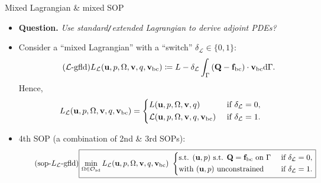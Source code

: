 \documentclass[10pt
hyperref={
    pdfauthor={Hong Quan Ba Nguyen},
    pdftitle={Optimal Shape Design of Air Ducts in Combustion Engines: Design a General Framework},
    pdfsubject={Talk},
    pdfcreator={LaTeX},
}
]{beamer}
\begin{document}
\begin{frame}{Mixed Lagrangian {\small\&} mixed SOP}
    \begin{itemize}
        \item \textbf{Question.} \textit{Use standard\texttt{/}extended Lagrangian to derive adjoint PDEs?}
        \item Consider a ``mixed Lagrangian'' with a ``switch'' $\delta_{\mathcal{L}}\in\{0,1\}$:
        \begin{align}
            \label{mixed Lagrangian for general stationary fluid dynamics PDEs}
            \tag{$\mathcal{L}$-gfld}
            L_{\mathcal{L}}(\textbf{u},p,\Omega,\textbf{v},q,\textbf{v}_{\rm bc})\coloneqq L - \delta_{\mathcal{L}}\int_\Gamma \left(\textbf{Q} - \textbf{f}_{\rm bc}\right)\cdot\textbf{v}_{\rm bc}{\rm d}\Gamma.
        \end{align}
        Hence,
        \begin{equation*}
            L_{\mathcal{L}}(\textbf{u},p,\Omega,\textbf{v},q,\textbf{v}_{\rm bc}) = \left\{\begin{split}
                &L(\textbf{u},p,\Omega,\textbf{v},q) &&\mbox{ if } \delta_{\mathcal{L}} = 0,\\
                &\mathcal{L}(\textbf{u},p,\Omega,\textbf{v},q,\textbf{v}_{\rm bc}) &&\mbox{ if } \delta_{\mathcal{L}} = 1.
            \end{split}\right.
        \end{equation*}
        \item 4th SOP (a combination of 2nd {\small\&} 3rd SOPs):
        \begin{equation}
            \label{SOP for mixed Lagrangian for general stationary fluid dynamics PDEs}\tag{sop-$L_{\mathcal{L}}$-gfld}
            \boxed{\min_{\Omega\in\mathcal{O}_{\rm ad}} L_{\mathcal{L}}(\textbf{u},p,\Omega,\textbf{v},q,\textbf{v}_{\rm bc})\ \left\{\begin{split}
                &\mbox{s.t. } (\textbf{u},p) \mbox{ s.t. } \textbf{Q} = \textbf{f}_{\rm bc} \mbox{ on } \Gamma &&\mbox{ if } \delta_{\mathcal{L}} = 0,\\
                &\mbox{with } (\textbf{u},p) \mbox{ unconstrained} &&\mbox{ if } \delta_{\mathcal{L}} = 1.
            \end{split}\right.}
        \end{equation}
    \end{itemize}
\end{frame}
\end{document}
